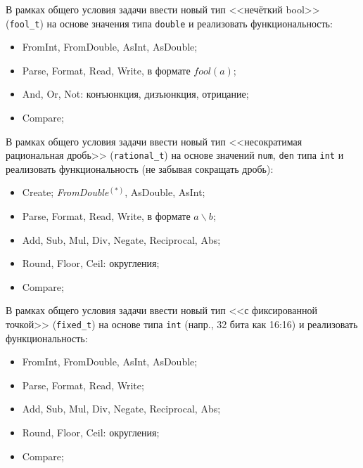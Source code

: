 
\begin{zztask}
В рамках общего условия задачи ввести новый тип <<нечёткий bool>>
(\texttt{fool\_t}) на основе значения типа \texttt{double} и реализовать
функциональность:
%
\begin{itemize}
\item FromInt, FromDouble, AsInt, AsDouble;
\item Parse, Format, Read, Write, в формате $\mathit{fool}(a)$;
\item And, Or, Not: конъюнкция, дизъюнкция, отрицание;
\item Compare;
\end{itemize}
\end{zztask}


\begin{zztask}
В рамках общего условия задачи ввести новый тип <<несократимая рациональная
дробь>> (\texttt{rational\_t}) на основе значений \texttt{num}, \texttt{den}
типа \texttt{int} и реализовать функциональность (не забывая сокращать дробь):
%
\begin{itemize}
\item Create; \textit{FromDouble}${}^{(\ast)}$, AsDouble, AsInt;
\item Parse, Format, Read, Write, в формате $a\backslash b$;
\item Add, Sub, Mul, Div, Negate, Reciprocal, Abs;
\item Round, Floor, Ceil: округления;
\item Compare;
\end{itemize}
\end{zztask}


\begin{zztask}
В рамках общего условия задачи ввести новый тип <<с фиксированной точкой>>
(\texttt{fixed\_t}) на основе типа \texttt{int} (напр., 32 бита как 16:16) и
реализовать функциональность:
%
\begin{itemize}
\item FromInt, FromDouble, AsInt, AsDouble;
\item Parse, Format, Read, Write;
\item Add, Sub, Mul, Div, Negate, Reciprocal, Abs;
\item Round, Floor, Ceil: округления;
\item Compare;
\end{itemize}
\end{zztask}

